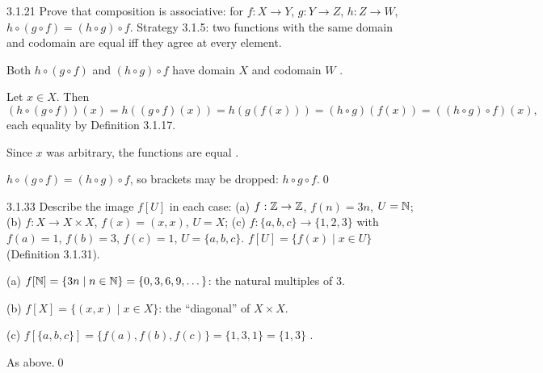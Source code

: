 \begin{bookex}[bonus]{3.1.21}
Prove that composition is associative: for $f:X\to Y$, $g:Y\to Z$, $h:Z\to W$, $h\circ(g\circ f)=(h\circ g)\circ f$.
\solution
\given Strategy 3.1.5: two functions with the same domain and codomain are equal iff they agree at every element.
\begin{steps}
\item Both $h\circ(g\circ f)$ and $(h\circ g)\circ f$ have domain $X$ and codomain $W$ .
\item Let $x\in X$. Then
\[
(h\circ(g\circ f))(x)=h((g\circ f)(x))=h(g(f(x)))=(h\circ g)(f(x))=((h\circ g)\circ f)(x),
\]
each equality by Definition 3.1.17.
\item Since $x$ was arbitrary, the functions are equal .
\end{steps}
\conclusion $h\circ(g\circ f)=(h\circ g)\circ f$, so brackets may be dropped: $h\circ g\circ f$.\qed
\end{bookex}

\begin{bookex}[recommended]{3.1.33}
Describe the image $f[U]$ in each case: (a) $f:\mathbb{Z}\to\mathbb{Z}$, $f(n)=3n$, $U=\mathbb{N}$; (b) $f:X\to X\times X$, $f(x)=(x,x)$, $U=X$; (c) $f:\{a,b,c\}\to\{1,2,3\}$ with $f(a)=1$, $f(b)=3$, $f(c)=1$, $U=\{a,b,c\}$.
\solution
\given $f[U]=\{f(x)\mid x\in U\}$ (Definition 3.1.31).
\begin{steps}
\item (a) $f[\mathbb{N}]=\{3n\mid n\in\mathbb{N}\}=\{0,3,6,9,\dots\}$: the natural multiples of $3$.
\item (b) $f[X]=\{(x,x)\mid x\in X\}$: the ``diagonal'' of $X\times X$.
\item (c) $f[\{a,b,c\}]=\{f(a),f(b),f(c)\}=\{1,3,1\}=\{1,3\}$ .
\end{steps}
\answer As above.\qed
\end{bookex}

